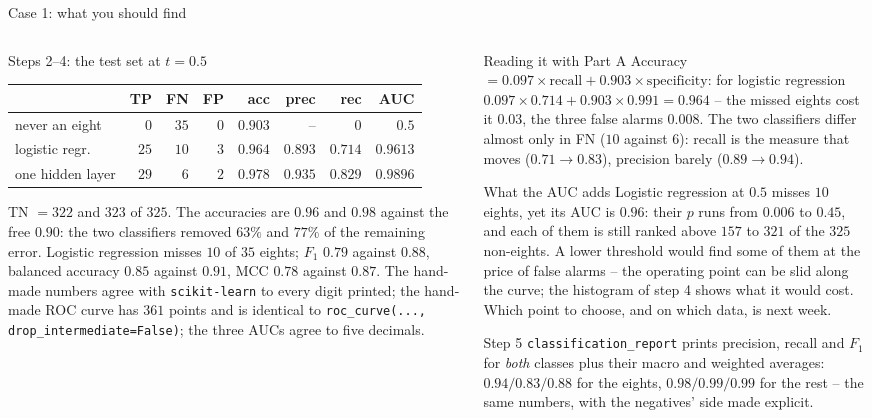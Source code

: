 \documentclass[10pt,aspectratio=169]{beamer}
\begin{document}
\begin{frame}{Case 1: what you should find}
\scriptsize
\begin{columns}[T]
\begin{column}{0.5\textwidth}
\begin{block}{Steps 2--4: the test set at $t=0.5$}
\begin{center}
\setlength{\tabcolsep}{3pt}
\begin{tabular}{@{}lrrrrrrr@{}}
\toprule
 & TP & FN & FP & acc & prec & rec & AUC\\
\midrule
never an eight & $0$ & $35$ & $0$ & $0.903$ & -- & $0$ & $0.5$\\
logistic regr. & $25$ & $10$ & $3$ & $0.964$ & $0.893$ & $0.714$ & $0.9613$\\
one hidden layer & $29$ & $6$ & $2$ & $0.978$ & $0.935$ & $0.829$ & $0.9896$\\
\bottomrule
\end{tabular}
\end{center}
TN $=322$ and $323$ of $325$.  The accuracies are $0.96$ and $0.98$ against
the free $0.90$: the two classifiers removed $63\%$ and $77\%$ of the
remaining error.  Logistic regression misses $10$ of $35$ eights; $F_1$
$0.79$ against $0.88$, balanced accuracy $0.85$ against $0.91$, MCC $0.78$
against $0.87$.  The hand-made numbers agree with \texttt{scikit-learn} to
every digit printed; the hand-made ROC curve has $361$ points and is
identical to \texttt{roc\_curve(..., drop\_intermediate=False)}; the three
AUCs agree to five decimals.
\end{block}
\end{column}
\begin{column}{0.48\textwidth}
\begin{block}{Reading it with Part A}
Accuracy $=0.097\times\mathrm{recall}+0.903\times\mathrm{specificity}$:
for logistic regression $0.097\times0.714+0.903\times0.991=0.964$ -- the
missed eights cost it $0.03$, the three false alarms $0.008$.  The two
classifiers differ almost only in FN ($10$ against $6$): recall is the
measure that moves ($0.71\to0.83$), precision barely
($0.89\to0.94$).
\end{block}
\begin{block}{What the AUC adds}
Logistic regression at $0.5$ misses $10$ eights, yet its AUC is $0.96$:
their $p$ runs from $0.006$ to $0.45$, and each of them is still ranked
above $157$ to $321$ of the $325$ non-eights.  A lower threshold would
find some of them at the price of false alarms -- the operating point can
be slid along the curve; the histogram of step 4 shows what it would cost.
Which point to choose, and on which data, is next week.
\end{block}
\begin{block}{Step 5}
\texttt{classification\_report} prints precision, recall and $F_1$ for
\emph{both} classes plus their macro and weighted averages: $0.94/0.83/0.88$
for the eights, $0.98/0.99/0.99$ for the rest -- the same numbers, with the
negatives' side made explicit.
\end{block}
\end{column}
\end{columns}
\end{frame}
\end{document}
